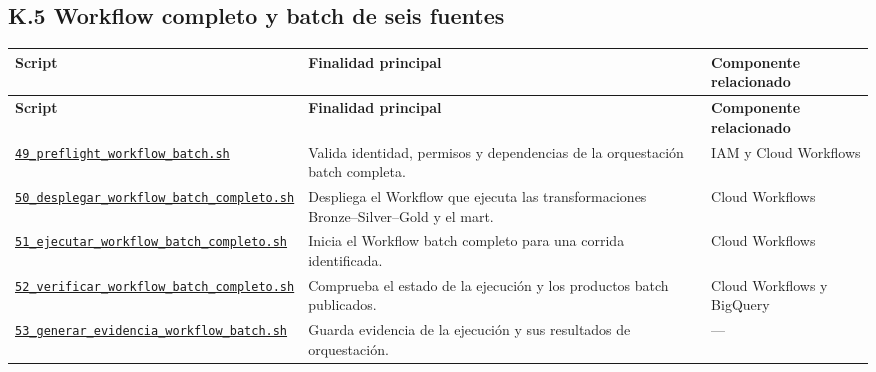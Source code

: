 \documentclass[11pt]{article}
\begin{document}
\subsection*{K.5 Workflow completo y batch de seis fuentes}
\begingroup\scriptsize
\begin{longtable}{@{}>{\raggedright\arraybackslash}p{}>{\raggedright\arraybackslash}p{}>{\raggedright\arraybackslash}p{}@{}}
\toprule
\textbf{Script} & \textbf{Finalidad principal} & \textbf{Componente relacionado} \\
\midrule
\endfirsthead
\toprule
\textbf{Script} & \textbf{Finalidad principal} & \textbf{Componente relacionado} \\
\midrule
\endhead
\href{https://github.com/Codenid/lumina-retail-data-platform/blob/main/implementation/automatizacion/scripts49_preflight_workflow_batch.sh}{\texttt{49\_\allowbreak{}preflight\_\allowbreak{}workflow\_\allowbreak{}batch.sh}} & Valida identidad, permisos y dependencias de la orquestación batch completa. & IAM y Cloud Workflows \\
\href{https://github.com/Codenid/lumina-retail-data-platform/blob/main/implementation/automatizacion/scripts50_desplegar_workflow_batch_completo.sh}{\texttt{50\_\allowbreak{}desplegar\_\allowbreak{}workflow\_\allowbreak{}batch\_\allowbreak{}completo.sh}} & Despliega el Workflow que ejecuta las transformaciones Bronze–Silver–Gold y el mart. & Cloud Workflows \\
\href{https://github.com/Codenid/lumina-retail-data-platform/blob/main/implementation/automatizacion/scripts51_ejecutar_workflow_batch_completo.sh}{\texttt{51\_\allowbreak{}ejecutar\_\allowbreak{}workflow\_\allowbreak{}batch\_\allowbreak{}completo.sh}} & Inicia el Workflow batch completo para una corrida identificada. & Cloud Workflows \\
\href{https://github.com/Codenid/lumina-retail-data-platform/blob/main/implementation/automatizacion/scripts52_verificar_workflow_batch_completo.sh}{\texttt{52\_\allowbreak{}verificar\_\allowbreak{}workflow\_\allowbreak{}batch\_\allowbreak{}completo.sh}} & Comprueba el estado de la ejecución y los productos batch publicados. & Cloud Workflows y BigQuery \\
\href{https://github.com/Codenid/lumina-retail-data-platform/blob/main/implementation/automatizacion/scripts53_generar_evidencia_workflow_batch.sh}{\texttt{53\_\allowbreak{}generar\_\allowbreak{}evidencia\_\allowbreak{}workflow\_\allowbreak{}batch.sh}} & Guarda evidencia de la ejecución y sus resultados de orquestación. & — \\

\end{longtable}
\end{document}
